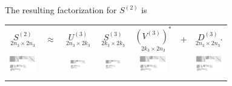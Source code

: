 \documentclass{sfuthesis}
\begin{document}
The resulting factorization for $S^{(2)}$ is
\begin{center}
	\begin{tabular}[b]{ccccccc}
$\underset{2n_3 \times 2n_3}{S^{(2)}}$ & $\approx$ & $ \underset{ \ 2n_3 \times 2k_3 \ } {U^{(3)}}$  &  $\underset{ \ 2k_3 \times 2k_3 \ }{S^{(3)}} $ & $\underset{ \ 2k_3 \times 2n_3 \ }{{(V^{(3)})}^*}$& + &$\underset{2n_3 \times 2n_3}{D^{(3)}}.$ \\ [.4cm]
	\includegraphics[width=1.2cm]{BFRecLev3S2} & & \includegraphics[width=0.7cm]{BFRecLev3U3} & \includegraphics[width=0.7cm]{BFRecLev3S3} &\vspace{0.2cm}\includegraphics[width=1.2cm]{BFRecLev3V3} &  &  \includegraphics[width=1.2cm]{BFRecLev3D3} 
	\end{tabular}
\end{center}
\end{document}
